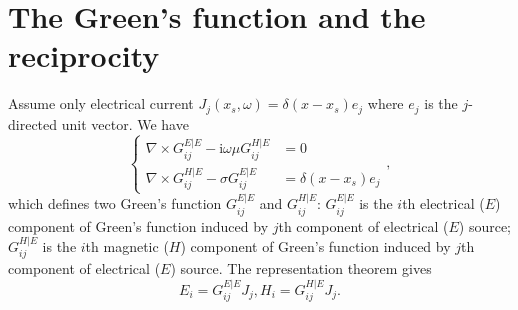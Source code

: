 \documentclass[a4paper,10pt]{article}
\begin{document}
\section{The Green's function and the reciprocity}\label{appendix:reciprocity}

Assume only electrical current $J_j(x_s,\omega)=\delta(x-x_s)e_j$ where $e_j$ is the $j$-directed unit vector. We have
\begin{equation}\label{eq:E|EH|E}
  \begin{cases}
    \nabla \times G_{ij}^{E|E} -\mathrm{i}\omega\mu  G_{ij}^{H|E} &= 0 \\
    \nabla \times G_{ij}^{H|E} -\sigma  G_{ij}^{E|E}  &=\delta(x-x_s)e_j
  \end{cases},
\end{equation}
which defines two Green's function $G_{ij}^{E|E}$ and $G_{ij}^{H|E}$: 
$G_{ij}^{E|E}$ is the $i$th electrical ($E$) component of Green's function induced 
by $j$th component of electrical ($E$) source; $G_{ij}^{H|E}$ is the $i$th 
magnetic ($H$) component of Green's function induced by $j$th component of 
electrical ($E$) source. The representation theorem gives
\begin{equation}\label{eq:green1}
  E_i =  G_{ij}^{E|E} J_j, H_i = G_{ij}^{H|E} J_j.
\end{equation}
\end{document}
